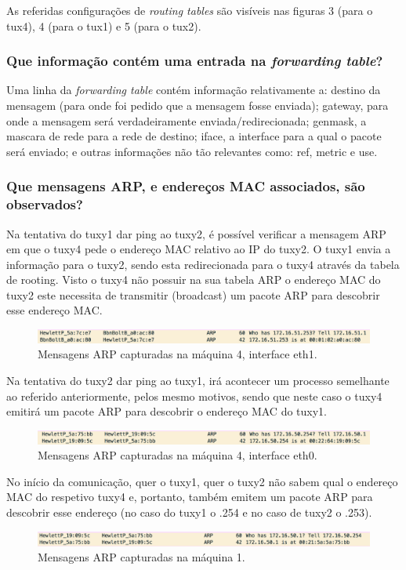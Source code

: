 \documentclass[a4paper, 11pt]{article}
\begin{document}
As referidas configurações de \textit{routing tables} são visíveis nas figuras 3 (para o tux4), 4 (para o tux1) e 5 (para o tux2).

\subsubsection{Que informação contém uma entrada na \textit{forwarding table}?}
Uma linha da \textit{forwarding table} contém informação relativamente a: destino da mensagem (para onde foi pedido que a mensagem fosse enviada); gateway, para onde a mensagem será verdadeiramente enviada/redirecionada; genmask, a mascara de rede para a rede de destino; iface, a interface para a qual o pacote será enviado; e outras informações não tão relevantes como: ref, metric e use.

\subsubsection{Que mensagens ARP, e endereços MAC associados, são observados?}
Na tentativa do tuxy1 dar ping ao tuxy2, é possível verificar a mensagem ARP em que o tuxy4 pede o endereço MAC relativo ao IP do tuxy2.
O tuxy1 envia a informação para o tuxy2, sendo esta redirecionada para o tuxy4 através da tabela de rooting. 
Visto o tuxy4 não possuir na sua tabela ARP o endereço MAC do tuxy2 este necessita de transmitir (broadcast) um pacote ARP para descobrir esse endereço MAC.
\begin{figure}[h]
\centering
\includegraphics[scale=0.5]{images/Exp3_tux4eth1_ARPtux2.png}
\caption{Mensagens ARP capturadas na máquina 4, interface eth1.}
\label{Momentanpol}
\end{figure}

Na tentativa do tuxy2 dar ping ao tuxy1, irá acontecer um processo semelhante ao referido anteriormente, pelos mesmo motivos, sendo que neste caso o tuxy4 emitirá um pacote ARP para descobrir o endereço MAC do tuxy1.
\begin{figure}[h]
\centering
\includegraphics[scale=0.5]{images/Exp3_tux4eth0_ARPtux1.png}
\caption{Mensagens ARP capturadas na máquina 4, interface eth0.}
\label{Momentanpol}
\end{figure}

No início da comunicação, quer o tuxy1, quer o tuxy2 não sabem qual o endereço MAC do respetivo tuxy4 e, portanto, também emitem um pacote ARP para descobrir esse endereço (no caso do tuxy1 o .254 e no caso de tuxy2 o .253).
\begin{figure}[h]
\centering
\includegraphics[scale=0.5]{images/Exp3_arp_messages.png}
\caption{Mensagens ARP capturadas na máquina 1.}
\label{Momentanpol}
\end{figure}
\end{document}
